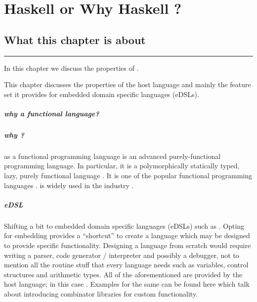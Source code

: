 \documentclass[thesis-solanki.tex]{subfiles}
\begin{document}
\chapter{Haskell or Why Haskell ?}\label{chap:hwh}


\section{What this chapter is about}

\noindent\rule{\textwidth}{0.5pt}


In this chapter we discuss the properties of .

This chapter discusses the properties of the host language  and mainly the feature set it
provides for embedded domain specific languages (eDSLs).


\paragraph{why a functional language?}

\paragraph{why ?}
 as a functional programming language  is an advanced purely-functional programming
  language.
  In particular, it is a polymorphically statically typed, lazy, purely functional language
  \cite{website:haskellwiki}.
  It is one of the popular functional programming languages \cite{website:langpop}.
   is widely used in the industry \cite{website:haskellinindustry}.

\paragraph{eDSL}
  Shifting a bit to embedded domain specific languages (eDSLs) such as .
  Opting for embedding provides a ``shortcut'' to create a language which may be designed to provide specific
  functionality.
  Designing a language from scratch would require writing a parser, code generator / interpreter and possibly a
  debugger, not to mention all the routine stuff that every language
  needs such as variables, control structures and 
  arithmetic types.
  All of the aforementioned are provided by the host language; in this case .
  Examples for the same can be found here \cite{jones2001composing, meyer2008eiffel} which talk about introducing
  combinator libraries for custom functionality.
\end{document}
